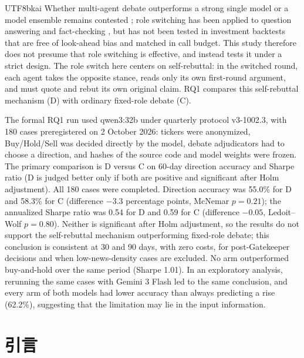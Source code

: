 \documentclass[12pt,a4paper]{article}
\begin{document}
\begin{CJK}{UTF8}{bkai}
Whether multi-agent debate outperforms a strong single model or a model ensemble remains contested \citep{smit2023mad,zhang2025stop}; role switching has been applied to question answering and fact-checking \citep{liu2025roleswitch,chowdhury2026proclaim}, but has not been tested in investment backtests that are free of look-ahead bias and matched in call budget. This study therefore does not presume that role switching is effective, and instead tests it under a strict design. The role switch here centers on self-rebuttal: in the switched round, each agent takes the opposite stance, reads only its own first-round argument, and must quote and rebut its own original claim. RQ1 compares this self-rebuttal mechanism (D) with ordinary fixed-role debate (C).

The formal RQ1 run used qwen3:32b under quarterly protocol v3-1002.3, with 180 cases preregistered on 2 October 2026: tickers were anonymized, Buy/Hold/Sell was decided directly by the model, debate adjudicators had to choose a direction, and hashes of the source code and model weights were frozen. The primary comparison is D versus C on 60-day direction accuracy and Sharpe ratio (D is judged better only if both are positive and significant after Holm adjustment). All 180 cases were completed. Direction accuracy was 55.0\% for D and 58.3\% for C (difference $-3.3$ percentage points, McNemar $p=0.21$); the annualized Sharpe ratio was 0.54 for D and 0.59 for C (difference $-0.05$, Ledoit--Wolf $p=0.80$). Neither is significant after Holm adjustment, so the results do not support the self-rebuttal mechanism outperforming fixed-role debate; this conclusion is consistent at 30 and 90 days, with zero costs, for post-Gatekeeper decisions and when low-news-density cases are excluded. No arm outperformed buy-and-hold over the same period (Sharpe 1.01). In an exploratory analysis, rerunning the same cases with Gemini 3 Flash led to the same conclusion, and every arm of both models had lower accuracy than always predicting a rise (62.2\%), suggesting that the limitation may lie in the input information.

\clearpage
{}

\section{引言}
\label{sec:motivation}


\end{CJK}
\end{document}
